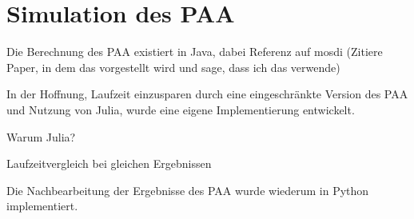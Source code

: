 
\section{Simulation des PAA}
Die Berechnung des PAA existiert in Java, dabei Referenz auf mosdi (Zitiere Paper, in dem das vorgestellt wird und sage, dass ich das verwende)

In der Hoffnung, Laufzeit einzusparen durch eine eingeschränkte Version des PAA und Nutzung von Julia, wurde eine eigene Implementierung entwickelt.


Warum Julia? 

Laufzeitvergleich bei gleichen Ergebnissen

Die Nachbearbeitung der Ergebnisse des PAA wurde wiederum in Python implementiert.


